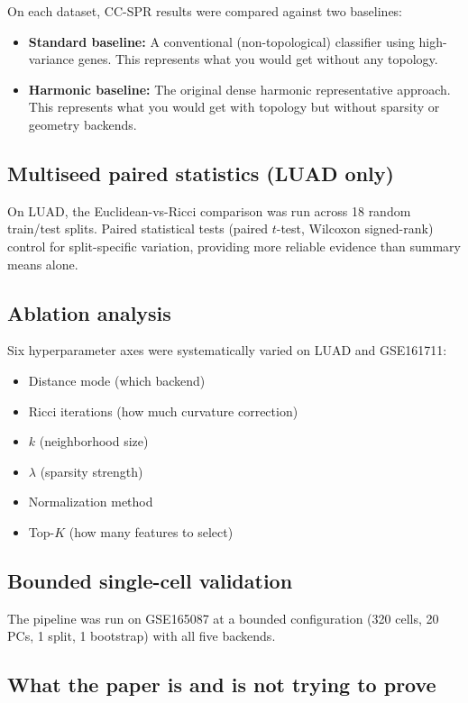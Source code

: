 \documentclass[11pt]{article}
\begin{document}
On each dataset, CC-SPR results were compared against two baselines:
\begin{itemize}[leftmargin=1.5em]
\item \textbf{Standard baseline:} A conventional (non-topological) classifier using high-variance genes.
This represents what you would get without any topology.
\item \textbf{Harmonic baseline:} The original dense harmonic representative approach.
This represents what you would get with topology but without sparsity or geometry backends.
\end{itemize}

\subsection{Multiseed paired statistics (LUAD only)}

On LUAD, the Euclidean-vs-Ricci comparison was run across 18 random train/test splits.
Paired statistical tests (paired $t$-test, Wilcoxon signed-rank) control for split-specific variation, providing more reliable evidence than summary means alone.

\subsection{Ablation analysis}

Six hyperparameter axes were systematically varied on LUAD and GSE161711:
\begin{itemize}[leftmargin=1.5em]
\item Distance mode (which backend)
\item Ricci iterations (how much curvature correction)
\item $k$ (neighborhood size)
\item $\lambda$ (sparsity strength)
\item Normalization method
\item Top-$K$ (how many features to select)
\end{itemize}

\subsection{Bounded single-cell validation}

The pipeline was run on GSE165087 at a bounded configuration (320 cells, 20 PCs, 1 split, 1 bootstrap) with all five backends.

\subsection{What the paper is and is not trying to prove}
\end{document}
